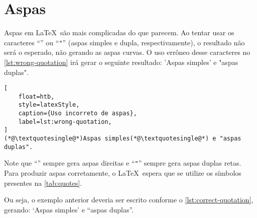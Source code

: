 \section{Aspas}

Aspas em \LaTeX\ são mais complicadas do que parecem. Ao tentar usar os caracteres \enquote{\texttt{\textquotesingle}} ou \enquote{\texttt{"}} (aspas simples e dupla, respectivamente), o resultado não será o esperado, não gerando as aspas curvas.
O uso errôneo desse caracteres no \autoref{lst:wrong-quotation} irá gerar o seguinte resultado:
'Aspas simples' e "aspas duplas".

\begin{lstlisting}[
    float=htb, 
    style=latexStyle, 
    caption={Uso incorreto de aspas},
    label=lst:wrong-quotation,
]
(*@\textquotesingle@*)Aspas simples(*@\textquotesingle@*) e "aspas duplas".
\end{lstlisting}

Note que \enquote{\texttt{\textquotesingle}} sempre gera aspas direitas e \enquote{\texttt{"}} sempre gera aspas duplas retas.
Para produzir aspas corretamente, o \LaTeX\ espera que se utilize os símbolos presentes na \autoref{tab:quotes}.

\begin{table}[htb] 
	\begin{center} 
	\end{center} 
\end{table} 

Ou seja, o exemplo anterior deveria ser escrito conforme o \autoref{lst:correct-quotation}, gerando:
`Aspas simples' e ``aspas duplas''.

